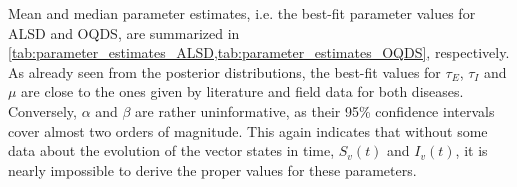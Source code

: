 Mean and median parameter estimates, i.e. the best-fit parameter values for
ALSD and OQDS, are summarized in
\cref{tab:parameter_estimates_ALSD,tab:parameter_estimates_OQDS}, respectively.
As already seen from the posterior distributions, the best-fit values for
$\tau_E$, $\tau_I$ and $\mu$ are close to the ones given by literature and
field data for both diseases. Conversely, $\alpha$ and $\beta$ are rather
uninformative, as their 95\% confidence intervals cover almost two orders of
magnitude. This again indicates that without some data about the evolution of
the vector states in time, $S_v(t)$ and $I_v(t)$, it is nearly impossible to
derive the proper values for these parameters.

\begin{table}[H]
    \centering
    \caption[Estimated parameters of the model for ALSD in Mallorca]{Estimated
        epidemiological
        parameters from Bayesian model
        fitting to the disease progression curve of ALSD in Mallorca.}
    \label{tab:parameter_estimates_ALSD}
\end{table}

